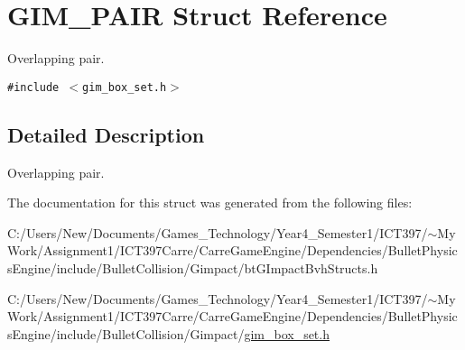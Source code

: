\hypertarget{struct_g_i_m___p_a_i_r}{
\section{GIM\_\-PAIR Struct Reference}
\label{struct_g_i_m___p_a_i_r}
}
Overlapping pair.  


{\tt \#include $<$gim\_\-box\_\-set.h$>$}



\subsection{Detailed Description}
Overlapping pair. 

The documentation for this struct was generated from the following files:\begin{CompactItemize}
\item 
C:/Users/New/Documents/Games\_\-Technology/Year4\_\-Semester1/ICT397/$\sim$My Work/Assignment1/ICT397Carre/CarreGameEngine/Dependencies/BulletPhysicsEngine/include/BulletCollision/Gimpact/btGImpactBvhStructs.h\item 
C:/Users/New/Documents/Games\_\-Technology/Year4\_\-Semester1/ICT397/$\sim$My Work/Assignment1/ICT397Carre/CarreGameEngine/Dependencies/BulletPhysicsEngine/include/BulletCollision/Gimpact/\hyperlink{gim__box__set_8h}{gim\_\-box\_\-set.h}\end{CompactItemize}
